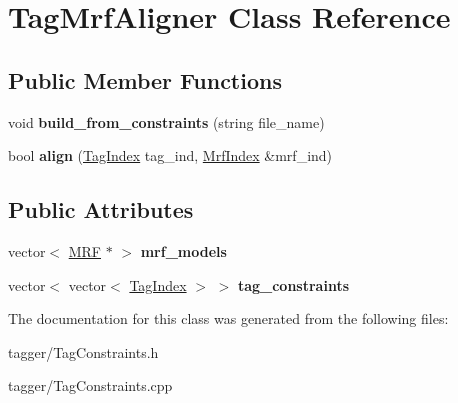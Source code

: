 \hypertarget{classTagMrfAligner}{
\section{TagMrfAligner Class Reference}
\label{classTagMrfAligner}
}
\subsection*{Public Member Functions}
\begin{DoxyCompactItemize}
\item 
\hypertarget{classTagMrfAligner_ae2bae21b52efb547b46f2da80f61ec42}{
void {\bfseries build\_\-from\_\-constraints} (string file\_\-name)}
\label{classTagMrfAligner_ae2bae21b52efb547b46f2da80f61ec42}

\item 
\hypertarget{classTagMrfAligner_a5b6ecf59596d656333f8113f6f05eba4}{
bool {\bfseries align} (\hyperlink{structTagIndex}{TagIndex} tag\_\-ind, \hyperlink{structMrfIndex}{MrfIndex} \&mrf\_\-ind)}
\label{classTagMrfAligner_a5b6ecf59596d656333f8113f6f05eba4}

\end{DoxyCompactItemize}
\subsection*{Public Attributes}
\begin{DoxyCompactItemize}
\item 
\hypertarget{classTagMrfAligner_a8a5d34bcfecdfb8c3901297ad34e301d}{
vector$<$ \hyperlink{classMRF}{MRF} $\ast$ $>$ {\bfseries mrf\_\-models}}
\label{classTagMrfAligner_a8a5d34bcfecdfb8c3901297ad34e301d}

\item 
\hypertarget{classTagMrfAligner_ae20f5a7d1131701986a36b70dca2c26f}{
vector$<$ vector$<$ \hyperlink{structTagIndex}{TagIndex} $>$ $>$ {\bfseries tag\_\-constraints}}
\label{classTagMrfAligner_ae20f5a7d1131701986a36b70dca2c26f}

\end{DoxyCompactItemize}


The documentation for this class was generated from the following files:\begin{DoxyCompactItemize}
\item 
tagger/TagConstraints.h\item 
tagger/TagConstraints.cpp\end{DoxyCompactItemize}
